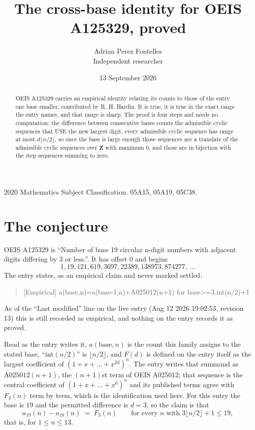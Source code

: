\documentclass[11pt,a4paper]{article}
\title{The cross-base identity for OEIS A125329, proved}
\author{Adrian Perez Fontelles\\ \small Independent researcher}
\date{13 September 2026}
\theoremstyle{plain}
\theoremstyle{definition}
\begin{document}
\maketitle

\begin{abstract}
OEIS A125329 carries an empirical identity relating its counts to those of the entry one base
smaller, contributed by R. H. Hardin. It is true, it is true in the exact range the entry
names, and that range is sharp. The proof is four steps and needs no computation: the
difference between consecutive bases counts the admissible cyclic sequences that USE the new
largest digit, every admissible cyclic sequence has range at most $d\lfloor n/2\rfloor$, so
once the base is large enough those sequences are a translate of the admissible cyclic
sequences over $\mathbf{Z}$ with maximum $0$, and those are in bijection with the step
sequences summing to zero.
\end{abstract}

\noindent\small 2020 Mathematics Subject Classification. 05A15, 05A19, 05C38.\normalsize

\section{The conjecture}

OEIS A125329 is ``Number of base 19 circular n-digit numbers with adjacent digits differing by 3 or less.''. It has offset $0$ and begins
\[
1, 19, 121, 619, 3697, 22389, 138973, 874277,\ \dots
\]
The entry states, as an empirical claim and never marked settled:
\begin{quote}
[Empirical] a(base,n)=a(base-1,n)+A025012(n+1) for base>=3.int(n/2)+1
\end{quote}
As of the ``Last modified'' line on the live entry (Aug 12 2026 19:02:53, revision 13)
this is still recorded as empirical, and nothing on the entry records it as proved.

Read as the entry writes it, $a(\mathrm{base},n)$ is the count this family assigns to the
stated base, ``$\mathrm{int}(n/2)$'' is $\lfloor n/2\rfloor$, and $F(d)$ is defined on the
entry itself as the largest coefficient of $(1+x+\dots+x^{2d})^{n}$. The entry writes that summand as $\mathrm{A025012}(n+1)$, the $(n+1)$st term of OEIS A025012; that sequence is the central coefficient of $(1+x+\dots+x^{6})^{n}$ and its published terms agree with $F_{3}(n)$ term by term, which is the identification used here. For this entry
the base is $19$ and the permitted difference is $d=3$, so the claim is that
\[
a_{19}(n)-a_{18}(n)\;=\;F_{3}(n)
\qquad\text{for every } n \text{ with } 3\lfloor n/2\rfloor+1\le19,
\]
that is, for $1\le n\le13$.
\end{document}
